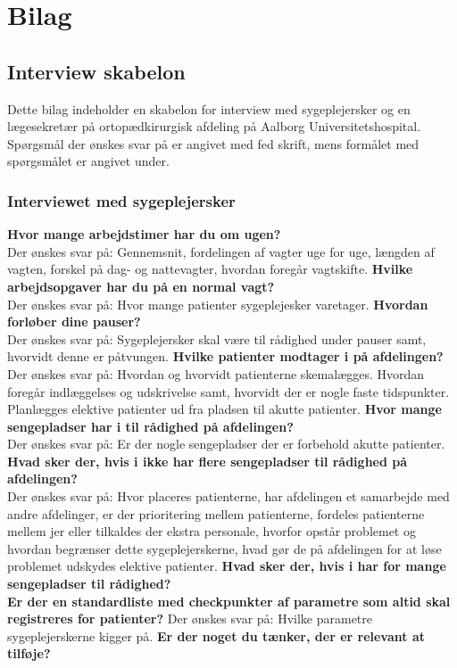 \chapter{Bilag}

\section{Interview skabelon} \label{bilagA}
Dette bilag indeholder en skabelon for interview med sygeplejersker og en lægesekretær på ortopædkirurgisk afdeling på Aalborg Universitetshospital. Spørgsmål der ønskes svar på er angivet med fed skrift, mens formålet med spørgsmålet er angivet under. 

\subsection{Interviewet med sygeplejersker}
\textbf{Hvor mange arbejdstimer har du om ugen?} \\
\noindent
Der ønskes svar på: Gennemsnit, fordelingen af vagter uge for uge, længden af vagten, forskel på dag- og nattevagter, hvordan foregår vagtskifte. 
\noindent
\textbf{Hvilke arbejdsopgaver har du på en normal vagt?} \\
\noindent
Der ønskes svar på: Hvor mange patienter sygeplejesker varetager. 
\noindent
\textbf{Hvordan forløber dine pauser?} \\
\noindent
Der ønskes svar på: Sygeplejersker skal være til rådighed under pauser samt, hvorvidt denne er påtvungen. 
\noindent
\textbf{Hvilke patienter modtager i på afdelingen?} \\
\noindent
Der ønskes svar på: Hvordan og hvorvidt patienterne skemalægges. Hvordan foregår indlæggelses og udskrivelse samt, hvorvidt der er nogle faste tidspunkter. Planlægges elektive patienter ud fra pladsen til akutte patienter.  
\noindent
\textbf{Hvor mange sengepladser har i til rådighed på afdelingen?}  \\
\noindent
Der ønskes svar på: Er der nogle sengepladser der er forbehold akutte patienter.
\noindent
\textbf{Hvad sker der, hvis i ikke har flere sengepladser til rådighed på afdelingen?} \\
\noindent
Der ønskes svar på: Hvor placeres patienterne, har afdelingen et samarbejde med andre afdelinger, er der prioritering mellem patienterne, fordeles patienterne mellem jer eller tilkaldes der ekstra personale, hvorfor opstår problemet og hvordan begrænser dette sygeplejerskerne, hvad gør de på afdelingen for at løse problemet udskydes elektive patienter. 
\noindent
\textbf{Hvad sker der, hvis i har for mange sengepladser til rådighed?} \\
\noindent
\textbf{Er der en standardliste med checkpunkter af parametre som altid skal registreres for patienter?} 
\noindent
Der ønskes svar på: Hvilke parametre sygeplejerskerne kigger på. 
\noindent
\textbf{Er der noget du tænker, der er relevant at tilføje?}


